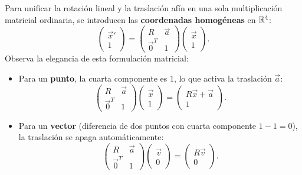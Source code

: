 \documentclass[11pt,letterpaper]{article}
\begin{document}
Para unificar la rotación lineal y la traslación afín en una sola multiplicación matricial ordinaria, se introducen las \textbf{coordenadas homogéneas} en $\mathbb{R}^4$:
\[
\begin{pmatrix} \vec{x}' \\ 1 \end{pmatrix} = \begin{pmatrix} R & \vec{a} \\ \vec{0}^T & 1 \end{pmatrix} \begin{pmatrix} \vec{x} \\ 1 \end{pmatrix}.
\]
Observa la elegancia de esta formulación matricial:
\begin{itemize}
    \item Para un \textbf{punto}, la cuarta componente es $1$, lo que activa la traslación $\vec{a}$:
    \[
    \begin{pmatrix} R & \vec{a} \\ \vec{0}^T & 1 \end{pmatrix} \begin{pmatrix} \vec{x} \\ 1 \end{pmatrix} = \begin{pmatrix} R\vec{x} + \vec{a} \\ 1 \end{pmatrix}.
    \]
    \item Para un \textbf{vector} (diferencia de dos puntos con cuarta componente $1 - 1 = 0$), la traslación se apaga automáticamente:
    \[
    \begin{pmatrix} R & \vec{a} \\ \vec{0}^T & 1 \end{pmatrix} \begin{pmatrix} \vec{v} \\ 0 \end{pmatrix} = \begin{pmatrix} R\vec{v} \\ 0 \end{pmatrix}.
    \]
\end{itemize}
\end{document}
